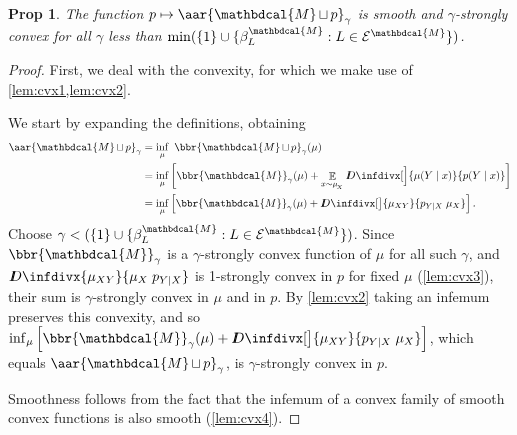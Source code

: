 \documentclass{article}
\theoremstyle{plain}
\newtheorem{prop}[theorem]{Prop}
\theoremstyle{definition}
\theoremstyle{remark}
\DeclareMathOperator*{\Ex}{\mathbb{E}} %
\newcommand\mat[1]{\mathbf{#1}}
\newcommand{\thickD}{I\mkern-8muD}
\newcommand{\kldiv}{\thickD\infdivx}
\newcommand{\bp}[1][L]{\mat{p}_{\!_{#1}\!}}
\newcommand{\Ed}{\mathcal E}
\newcommand{\dg}[1]{\mathbdcal{#1}}
\newcommand\smid{\!\mid\!}
\DeclareMathOperator{\bundle}{\sqcup}
\newcommand\commentout[1]{}
\newcommand{\IDef}[1]{\mathit{IDef}_{\!#1}}
\newcommand\Inc{\mathit{Inc}}
\newcommand{\ed}[3]{%
	\mathchoice%
	{#2\overset{\smash{\mskip-5mu\raisebox{-3pt}{${#1}$}}}{\xrightarrow{\hphantom{\scriptstyle {#1}}}} #3} %
	{#2\overset{\smash{\mskip-5mu\raisebox{-3pt}{$\scriptstyle {#1}$}}}{\xrightarrow{\hphantom{\scriptstyle {#1}}}} #3}%
	{#2\overset{\smash{\mskip-5mu\raisebox{-3pt}{$\scriptscriptstyle {#1}$}}}{\xrightarrow{\hphantom{\scriptscriptstyle {#1}}}} #3} %
	{#2\overset{\smash{\mskip-5mu\raisebox{-3pt}{$\scriptscriptstyle {#1}$}}}{\xrightarrow{\hphantom{\scriptscriptstyle {#1}}}} #3}} %
\begin{document}
\begin{prop}
	The function $p \mapsto \aar{\dg M \bundle p}_\gamma$ is smooth and $\gamma$-strongly convex for all $\gamma$ less than $\min (\{1\}\cup\{ \beta^{\dg M}_L : L \in \Ed^{\dg M}\})$. 
\end{prop}
\begin{proof}
	First, we deal with the convexity, for which we make use of \cref{lem:cvx1,lem:cvx2}.
	\commentout{
		\def\mw#1{{\mat w}_{\!_{#1}}}
		\def\ofmw(#1|#2){(\mw{#1} \smid \mw{#2})}
		\begin{align*}
			\aar{\dg M \bundle p}_\gamma &= \inf_\mu \Big[ \Inc_{\dg M \bundle p}(\mu) 
				+ \IDef{\dg M \bundle p}(\mu) \Big] \\
			&=  \inf_{\mu} \Ex_{\mat w \sim \mu} 
				\left[\log \mu(\mat w) +
				 	\beta_p \log \frac{\mu\ofmw(Y|X)}{p\ofmw(Y|X)} \; +  \!\sum_{\ed LAB} \beta_L \log \frac{\mu\ofmw(B|A)}{\bp\ofmw(B|A)} + \alpha_L \log \frac{0}{\mu\ofmw(B|A)}\right] \\
			&= f
		\end{align*}
	}
	We start by expanding the definitions, obtaining
	\begin{align*}
		\aar{\dg M \bundle p}_\gamma &= \inf_\mu ~\bbr{\dg M \bundle p}_\gamma(\mu) \\
			&= \inf_\mu \left[ \bbr{\dg M }_\gamma(\mu)
				+ \Ex_{x\sim\mu_{\!_X}} \kldiv[\Big]{\mu(Y\mid x)}{p(Y\mid x)} \right]\\
			&= \inf_\mu \left[ \bbr{\dg M }_\gamma(\mu)
				+  \kldiv[\big]{\mu_{XY}}{p_{Y \mid X}\; \mu_X} \right].
	\end{align*}
	Choose $\gamma < (\{1\}\cup\{ \beta^{\dg M}_L : L \in \Ed^{\dg M}\})$.
	Since $\bbr{\dg M}_\gamma$ is a $\gamma$-strongly convex function of $\mu$ for all
	such $\gamma$, and 
	$\kldiv{\mu_{XY}}{\mu_X \; p_{Y\mid X}}$ is 1-strongly 
	convex in $p$ for fixed $\mu$ (\cref{lem:cvx3}), 
	their sum is $\gamma$-strongly convex in $\mu$ and in $p$.
	By \cref{lem:cvx2} taking an infemum preserves this convexity,
	and so
	$
	 	\inf_\mu \left[ \bbr{\dg M }_\gamma(\mu)
		+  \kldiv[\big]{\mu_{XY}}{p_{Y \mid X}\; \mu_X} \right]
	$, which equals $\aar{\dg M \bundle p}_\gamma$,
	is $\gamma$-strongly convex in $p$. 
	
	Smoothness follows from the fact that the infemum of a convex family of smooth
	convex functions is also smooth (\cref{lem:cvx4}). 
\end{proof}
\end{document}
